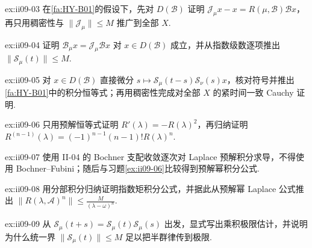 \begin{FAExercise}{ex:ii09-03}
在\autoref{fa:HY-B01}的假设下，先对 \(\displaystyle D(\mathcal B)\) 证明 \(\displaystyle\mathcal J_\mu x-x=R(\mu,\mathcal B)\mathcal Bx\)，再只用稠密性与 \(\displaystyle\|\mathcal J_\mu\|\leqslant M\) 推广到全部 \(\displaystyle X\).
\end{FAExercise}

\begin{FAExercise}[逼近生成元与指数半群界]{ex:ii09-04}
证明 \(\displaystyle\mathcal B_\mu x=\mathcal J_\mu\mathcal Bx\) 对 \(\displaystyle x\in D(\mathcal B)\) 成立，并从指数级数逐项推出 \(\displaystyle\|\mathcal S_\mu(t)\|\leqslant M\).
\end{FAExercise}

\begin{FAExercise}{ex:ii09-05}
对 \(\displaystyle x\in D(\mathcal B)\) 直接微分 \(\displaystyle s\mapsto\mathcal S_\mu(t-s)\mathcal S_\nu(s)x\)，核对符号并推出\autoref{fa:HY-B01}中的积分恒等式；再用稠密性完成对全部 \(\displaystyle X\) 的紧时间一致 Cauchy 证明.
\end{FAExercise}

\begin{FAExercise}[预解算子范数导数]{ex:ii09-06}
只用预解恒等式证明 \(\displaystyle R'(\lambda)=-R(\lambda)^2\)，再归纳证明 \(\displaystyle R^{(n-1)}(\lambda)=(-1)^{n-1}(n-1)!R(\lambda)^n\).
\end{FAExercise}

\begin{FAExercise}{ex:ii09-07}
使用 II-04 的 Bochner 支配收敛逐次对 Laplace 预解积分求导，不得使用 Bochner--Fubini；随后与习题\autoref{ex:ii09-06}比较得到预解幂积分公式.
\end{FAExercise}

\begin{FAExercise}{ex:ii09-08}
用分部积分归纳证明指数矩积分公式，并据此从预解幂 Laplace 公式推出 \(\displaystyle\|R(\lambda,\mathcal A)^n\|\leqslant \frac{M}{(\lambda-\omega)^n}\).
\end{FAExercise}

\begin{FAExercise}{ex:ii09-09}
从 \(\displaystyle\mathcal S_\mu(t+s)=\mathcal S_\mu(t)\mathcal S_\mu(s)\) 出发，显式写出乘积极限估计，并说明为什么统一界 \(\displaystyle\|\mathcal S_\mu(t)\|\leqslant M\) 足以把半群律传到极限.
\end{FAExercise}

